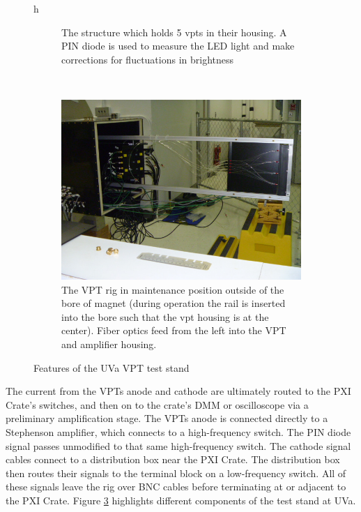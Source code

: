 \begin{figure}{h}
\begin{subfigure}[h]{0.450\textwidth}
        \caption{The structure which holds 5 vpts in their housing.
          A PIN diode is used to measure the LED light and make
          corrections for fluctuations in brightness}\label{fig:uva_vpt_rig_pin_and_house}
      \end{subfigure}
      ~ %
    \begin{subfigure}[h]{0.650\textwidth}
        \includegraphics[width=\textwidth]{Figures/CMS_Diagrams/UVaRig__Amplifier_and_Fibers.JPG}
        \caption{The VPT rig in maintenance position outside of the
          bore of magnet (during operation the rail is inserted into
          the bore such that the vpt housing is at the center).  Fiber
        optics feed from the left into the VPT and amplifier housing. }\label{fig:uva_vpt_rig_pin_and_house}
      \end{subfigure}
      \caption{Features of the UVa VPT test stand}\label{fig:uva_vpt_rig}
\end{figure}


\par The current from the VPTs anode and cathode are ultimately routed
to the PXI Crate’s switches, and then on to the crate’s DMM or
oscilloscope via a preliminary amplification stage.  The VPTs anode is
connected directly to a Stephenson amplifier, which connects to a
high-frequency switch. The PIN diode signal passes unmodified to that
same high-frequency switch. The cathode signal cables connect to a
distribution box near the PXI Crate. The distribution box then routes
their signals to the terminal block on a low-frequency switch. All of
these signals leave the rig over BNC cables before terminating at or
adjacent to the PXI Crate.  Figure \ref{fig:uva_vpt_rig} highlights
different components of the test stand at UVa.   




